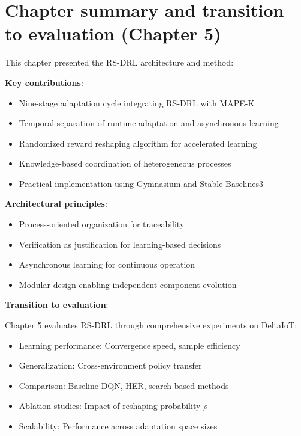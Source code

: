 \documentclass[11pt,a4paper]{article}
\begin{document}
\section{Chapter summary and transition to evaluation (Chapter 5)}

This chapter presented the RS-DRL architecture and method:

\textbf{Key contributions}:
\begin{itemize}
    \item Nine-stage adaptation cycle integrating RS-DRL with MAPE-K
    \item Temporal separation of runtime adaptation and asynchronous learning
    \item Randomized reward reshaping algorithm for accelerated learning
    \item Knowledge-based coordination of heterogeneous processes
    \item Practical implementation using Gymnasium and Stable-Baselines3
\end{itemize}

\textbf{Architectural principles}:
\begin{itemize}
    \item Process-oriented organization for traceability
    \item Verification as justification for learning-based decisions
    \item Asynchronous learning for continuous operation
    \item Modular design enabling independent component evolution
\end{itemize}

\textbf{Transition to evaluation}:

Chapter 5 evaluates RS-DRL through comprehensive experiments on DeltaIoT:
\begin{itemize}
    \item Learning performance: Convergence speed, sample efficiency
    \item Generalization: Cross-environment policy transfer
    \item Comparison: Baseline DQN, HER, search-based methods
    \item Ablation studies: Impact of reshaping probability $\rho$
    \item Scalability: Performance across adaptation space sizes
\end{itemize}
\end{document}
